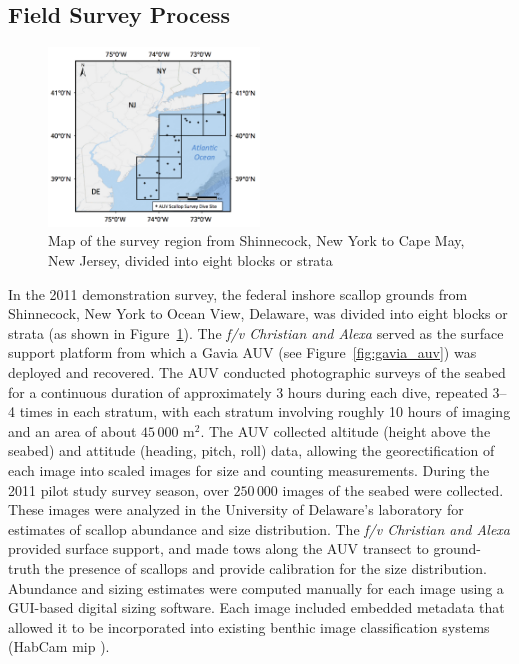 \documentclass {udthesis}
\begin{document}
\subsection*{Field Survey Process}
%
\begin{figure}
\centering
\includegraphics[width=0.5\textwidth, natwidth=944, natheight=800]{survey_region}
\caption{Map of the survey region from Shinnecock, New York to Cape May, New Jersey, 
divided into eight blocks or strata}
\label{fig:strata}
\end{figure}
%

In the 2011 demonstration survey, the federal inshore scallop grounds from Shinnecock, New York to Ocean View, Delaware, was divided into eight blocks or strata (as shown in Figure~\ref{fig:strata}).  
The \textit{f/v Christian and Alexa} served as the surface support platform 
from which a Gavia AUV (see Figure~\ref{fig:gavia_auv}) was deployed and recovered.  The AUV 
conducted photographic surveys of the seabed for a continuous duration of approximately
3 hours during each dive, repeated 3--4 times in each stratum, with
each stratum involving roughly 10 hours of imaging and an area of about $45\,000$ 
m$^2$.
The AUV collected altitude (height above the seabed) and 
attitude (heading, pitch, roll) data, allowing the georectification of each image 
into scaled images for size and counting measurements.  During the 2011 pilot study 
survey season, over $250\,000$ images of the seabed were collected. 
These images were analyzed in the University of Delaware's laboratory for estimates of scallop
abundance and size distribution.  The \textit{f/v Christian and Alexa} provided 
surface support, and made tows along the AUV transect to ground-truth the presence of 
scallops and provide calibration for the size distribution. 
Abundance and sizing estimates were computed manually for each image using a GUI-based 
digital sizing software. 
Each image included embedded metadata that 
allowed it to be incorporated into existing benthic image classification systems
(HabCam mip \cite{dawkings13}).
\end{document}
